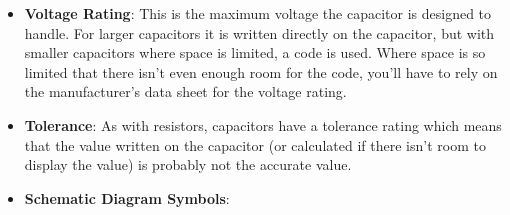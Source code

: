\documentclass{report}
\begin{document}
\begin{itemize}
            \bigbreak \noindent 
            \bigbreak \noindent 
            For example:
            \begin{align*}
                Digit 1 &= 1\\
                Digit 2 &= 0\\
                Digit 3 &= 4
            .\end{align*}
            So, 104 is written on the capacitor. Therefore, the value is 10 x 10,000, which equals 100,000 $pF$, or 100 nanofarads ($n F$), or 0.1 microfarads ($\mu F$).
        \item \textbf{Voltage Rating}: This is the maximum voltage the capacitor is designed to handle. For larger capacitors it is written directly on the capacitor, but with smaller capacitors where space is limited, a code is used. Where space is so limited that there isn't even enough room for the code, you'll have to rely on the manufacturer's data sheet for the voltage rating.
            \bigbreak \noindent 
        \item \textbf{Tolerance}: As with resistors, capacitors have a tolerance rating which means that the value written on the capacitor (or calculated if there isn't room to display the value) is probably not the accurate value.
            \bigbreak \noindent 
        \item \textbf{Schematic Diagram Symbols}: 
            \bigbreak \noindent 






    \end{itemize}
\end{document}
